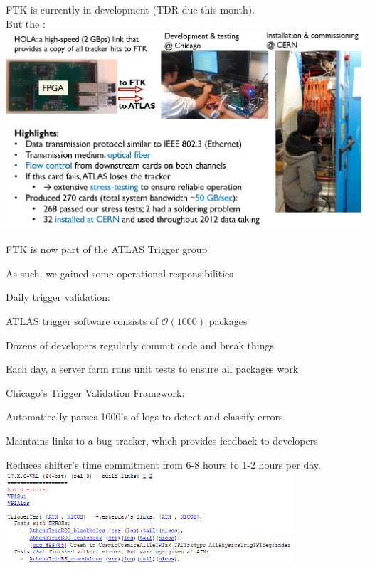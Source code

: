 {
FTK is currently in-development (TDR due this month). \\
But the :
\includegraphics[width=1.0\textwidth]{dates/mtg/figures/atlas/hola}
}

{
\iteb
\item FTK is now part of the ATLAS Trigger group
\iteb
\item As such, we gained some operational responsibilities
\itee
\item Daily trigger validation:
\iteb
\item ATLAS trigger software consists of $\mathcal{O}(1000)$ packages
\item Dozens of developers regularly commit code and break things
\item Each day, a server farm runs unit tests to ensure all packages work
\itee
\item Chicago's Trigger Validation Framework:
\iteb
\item Automatically parses 1000's of logs to detect and classify errors
\item Maintains links to a bug tracker, which provides feedback to developers
\item Reduces shifter's time commitment from 6-8 hours to 1-2 hours per day.
\itee
\itee
\includegraphics[width=0.8\textwidth]{dates/mtg/figures/atlas/shifts}
}


